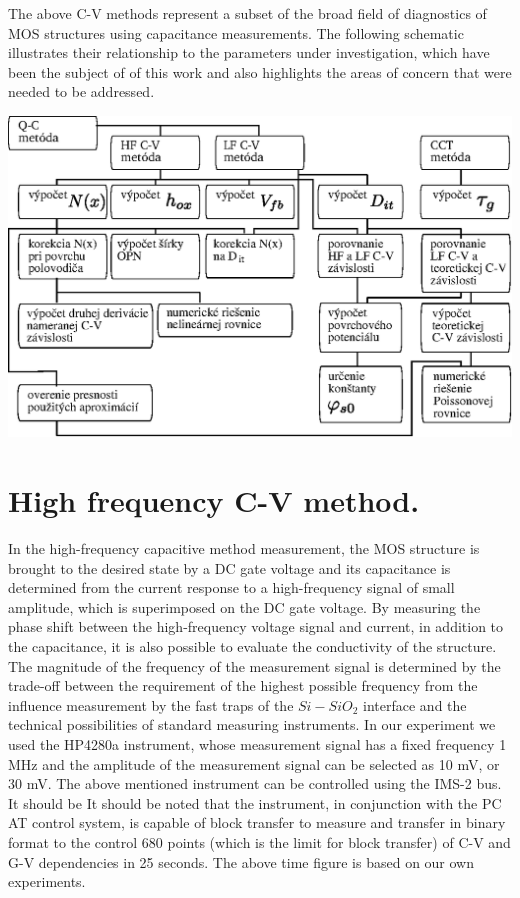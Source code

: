 The above C-V methods represent a subset of the broad field of
diagnostics of MOS structures using capacitance measurements. The
following schematic illustrates their relationship to the parameters
under investigation, which have been the subject of of this work and
also highlights the areas of concern that were needed to be addressed.

\begin{diagram}
  \centering
  \includegraphics[width=\textwidth,height=\textheight,scale=0.7,keepaspectratio]{Figures/diagram-1.EPS}\label{diagram:1}
\end{diagram}

\section{High frequency C-V method.}\label{sec:3.1}

In the high-frequency capacitive method measurement, the MOS structure
is brought to the desired state by a DC gate voltage and its
capacitance is determined from the current response to a
high-frequency signal of small amplitude, which is superimposed on the
DC gate voltage. By measuring the phase shift between the
high-frequency voltage signal and current, in addition to the
capacitance, it is also possible to evaluate the conductivity of the
structure. The magnitude of the frequency of the measurement signal is
determined by the trade-off between the requirement of the highest
possible frequency from the influence measurement by the fast traps of
the $Si-SiO_2$ interface and the technical possibilities of standard
measuring instruments.  In our experiment we used the HP4280a
instrument, whose measurement signal has a fixed frequency 1 MHz and
the amplitude of the measurement signal can be selected as 10 mV, or
30 mV.  The above mentioned instrument can be controlled using the
IMS-2 bus. It should be It should be noted that the instrument, in
conjunction with the PC AT control system, is capable of block
transfer to measure and transfer in binary format to the control 680
points (which is the limit for block transfer) of C-V and G-V
dependencies in 25 seconds.  The above time figure is based on our own
experiments.

